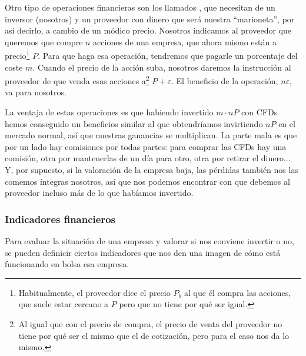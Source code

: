 \documentclass[nochap,palatino,notitlepage]{apuntes}
\begin{document}
Otro tipo de operaciones financieras son los llamados , que necesitan de un inversor (nosotros) y un proveedor con dinero que será nuestra ``marioneta'', por así decirlo, a cambio de un módico precio. Nosotros indicamos al proveedor que queremos que compre $n$ acciones de una empresa, que ahora mismo están a precio\footnote{Habitualmente, el proveedor dice el precio $P_b$ al que él compra las acciones, que suele estar cercano a $P$ pero que no tiene por qué ser igual.} $P$. Para que haga esa operación, tendremos que pagarle un porcentaje del coste $m$. Cuando el precio de la acción suba, nosotros daremos la instrucción al proveedor de que venda esas acciones a\footnote{Al igual que con el precio de compra, el precio de venta del proveedor no tiene por qué ser el mismo que el de cotización, pero para el caso nos da lo mismo.} $P + ε$. El beneficio de la operación, $nε$, va para nosotros.

La ventaja de estas operaciones es que habiendo invertido $m·nP$ con CFDs hemos conseguido un beneficios similar al que obtendríamos invirtiendo $nP$ en el mercado normal, así que nuestras ganancias se multiplican. La parte mala es que por un lado hay comisiones por todas partes: para comprar las CFDs hay una comisión, otra por mantenerlas de un día para otro, otra por retirar el dinero... Y, por supuesto, si la valoración de la empresa baja, las pérdidas también nos las comemos íntegras nosotros, así que nos podemos encontrar con que debemos al proveedor incluso más de lo que habíamos invertido.

\subsubsection{Indicadores financieros}
\label{sec:IndicadoresFinancieros}

Para evaluar la situación de una empresa y valorar si nos conviene invertir o no, se pueden definicir ciertos indicadores que nos den una imagen de cómo está funcionando en bolsa esa empresa.
\end{document}
